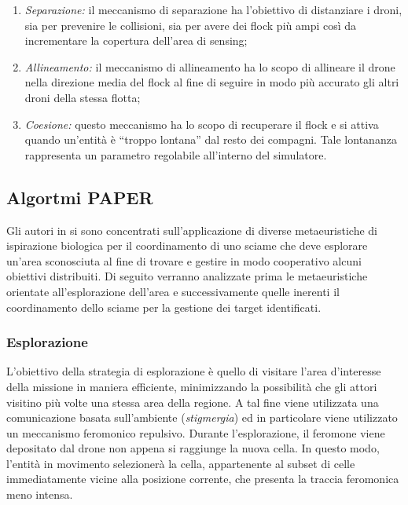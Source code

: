 \begin{enumerate}
    \item \textit{Separazione:} il meccanismo di separazione ha l'obiettivo di distanziare i droni, sia per prevenire le collisioni, sia per avere dei flock più ampi così da incrementare la copertura dell'area di sensing;
    \item \textit{Allineamento:} il meccanismo di allineamento ha lo scopo di allineare il drone nella direzione media del flock al fine di seguire in modo più accurato gli altri droni della stessa flotta;
    \item \textit{Coesione:} questo meccanismo ha lo scopo di recuperare il flock e si attiva quando un’entità è “troppo lontana” dal resto dei compagni. 
    Tale lontananza rappresenta un parametro regolabile all'interno del simulatore.
\end{enumerate}

\subsection{Algortmi PAPER}

Gli autori in \cite{palmieri2017comparison} si sono concentrati sull'applicazione di diverse metaeuristiche di ispirazione biologica per il coordinamento di uno sciame che deve esplorare un'area sconosciuta al fine di trovare e gestire in modo cooperativo alcuni obiettivi distribuiti.
Di seguito verranno analizzate prima le metaeuristiche orientate all'esplorazione dell'area e successivamente quelle inerenti il coordinamento dello sciame per la gestione dei target identificati.

\subsubsection{Esplorazione}

L'obiettivo della strategia di esplorazione è quello di visitare l'area d'interesse della missione in maniera efficiente, minimizzando la possibilità che gli attori visitino più volte una stessa area della regione.
A tal fine viene utilizzata una comunicazione basata sull'ambiente (\textit{stigmergia}) ed in particolare viene utilizzato un meccanismo feromonico repulsivo.
Durante l'esplorazione, il feromone viene depositato dal drone non appena si raggiunge la nuova cella. 
In questo modo, l'entità in movimento selezionerà la cella, appartenente al subset di celle immediatamente vicine alla posizione corrente, che presenta la traccia feromonica meno intensa.

